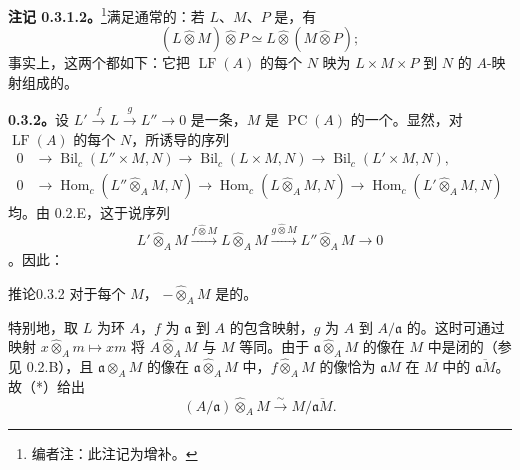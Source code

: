 \textbf{注记 0.3.1.2。}\footnote{编者注：此注记为增补。}满足通常的：若 $L$、$M$、$P$ 是，有
\[(L\widehat\otimes M)\widehat\otimes P\simeq L\widehat\otimes(M\widehat\otimes P);\]
事实上，这两个都如下：它把 $\operatorname{LF}(A)$ 的每个 $N$ 映为 $L\times M\times P$ 到 $N$ 的 $A$-映射组成的。

\textbf{0.3.2。}设 $L'\xrightarrow{f}L\xrightarrow{g}L''\to0$ 是一条，$M$ 是 $\operatorname{PC}(A)$ 的一个。显然，对 $\operatorname{LF}(A)$ 的每个 $N$，所诱导的序列
\[
\begin{aligned}
0&\longrightarrow\operatorname{Bil}_c(L''\times M,N)\longrightarrow\operatorname{Bil}_c(L\times M,N)\longrightarrow\operatorname{Bil}_c(L'\times M,N),\\
0&\longrightarrow\operatorname{Hom}_c(L''\widehat\otimes_A M,N)\longrightarrow\operatorname{Hom}_c(L\widehat\otimes_A M,N)\longrightarrow\operatorname{Hom}_c(L'\widehat\otimes_A M,N)
\end{aligned}
\]
均。由 0.2.E，这于说序列
\[
 L'\widehat\otimes_A M\xrightarrow{f\widehat\otimes M}L\widehat\otimes_A M
 \xrightarrow{g\widehat\otimes M}L''\widehat\otimes_A M\longrightarrow0\tag{*}
\]
。因此：
\begin{SGAresult}{推论}{0.3.2}
对于每个 $M$， $-\widehat\otimes_A M$ 是的。
\end{SGAresult}

特别地，取 $L$ 为环 $A$，$f$ 为 $\mathfrak a$ 到 $A$ 的包含映射，$g$ 为 $A$ 到 $A/\mathfrak a$ 的。这时可通过映射 $x\widehat\otimes_A m\mapsto xm$ 将 $A\widehat\otimes_A M$ 与 $M$ 等同。由于 $\mathfrak a\widehat\otimes_A M$ 的像在 $M$ 中是闭的（参见 0.2.B），且 $\mathfrak a\otimes_A M$ 的像在 $\mathfrak a\widehat\otimes_A M$ 中，$f\widehat\otimes_A M$ 的像恰为 $\mathfrak aM$ 在 $M$ 中的 $\overline{\mathfrak aM}$。故（*）给出
\[(A/\mathfrak a)\widehat\otimes_A M\xrightarrow{\sim}M/\overline{\mathfrak aM}.\]

